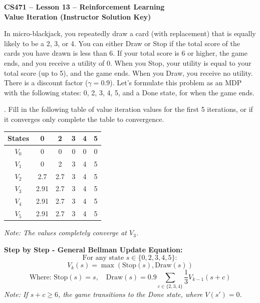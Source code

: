 \documentclass{article}
\begin{document}
\noindent \textbf{CS471 – Lesson 13 – Reinforcement Learning} \\
\textbf{Value Iteration (Instructor Solution Key)}

\vspace{0.5cm}
\noindent In micro-blackjack, you repeatedly draw a card (with replacement) that is equally likely to be a 2, 3, or 4. You can either Draw or Stop if the total score of the cards you have drawn is less than 6. If your total score is 6 or higher, the game ends, and you receive a utility of 0. When you Stop, your utility is equal to your total score (up to 5), and the game ends. When you Draw, you receive no utility. There is a discount factor ($\gamma=0.9$). Let's formulate this problem as an MDP with the following states: 0, 2, 3, 4, 5, and a Done state, for when the game ends.

\vspace{0.5cm}
. Fill in the following table of value iteration values for the first 5 iterations, or if it converges only complete the table to convergence.

\vspace{0.3cm}
\begin{center}
\renewcommand{\arraystretch}{2}
\begin{tabular}{|c|c|c|c|c|c|}
\hline
\textbf{States} & \textbf{0} & \textbf{2} & \textbf{3} & \textbf{4} & \textbf{5} \\
\hline
$V_0$ & 0 & 0 & 0 & 0 & 0 \\
\hline
$V_1$ & 0 & 2 & 3 & 4 & 5 \\
\hline
$V_2$ & 2.7 & 2.7 & 3 & 4 & 5 \\
\hline
$V_3$ & 2.91 & 2.7 & 3 & 4 & 5 \\
\hline
$V_4$ & 2.91 & 2.7 & 3 & 4 & 5 \\
\hline
$V_5$ & 2.91 & 2.7 & 3 & 4 & 5 \\
\hline
\end{tabular}
\end{center}
\vspace{0.2cm}
\textit{Note: The values completely converge at $V_3$.}

\vspace{0.3cm}
\noindent \textbf{Step by Step - General Bellman Update Equation:}
$$\text{For any state } s \in \{0, 2, 3, 4, 5\}:$$
$$V_{k}(s) = \max \left( \text{Stop}(s), \text{Draw}(s) \right)$$
$$\text{Where: } \text{Stop}(s) = s, \quad \text{Draw}(s) = 0.9 \sum_{c \in \{2,3,4\}} \frac{1}{3} V_{k-1}(s+c)$$
\noindent \textit{Note: If $s+c \ge 6$, the game transitions to the Done state, where $V(s') = 0$.}
\end{document}
